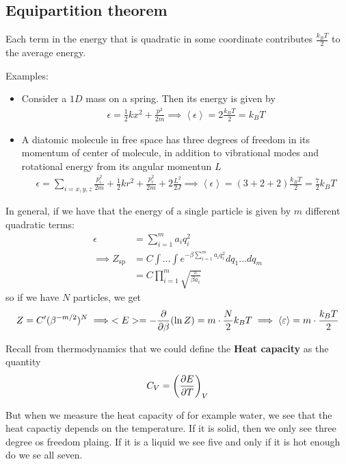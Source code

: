 \subsection{Equipartition theorem}
\begin{ntheorem}
	Each term in the energy that is quadratic in some coordinate contributes $\frac{k_B T}{2}$ to the average energy.
\end{ntheorem}
Examples:
\begin{itemize}
\item Consider a $1D$ mass on a spring. Then its energy is given by
	\begin{align*}
		\epsilon = \frac{1}{2} k x^2 + \frac{p^2}{2m} \implies \left<\epsilon\right> = 2 \frac{k_BT}{2} = k_B T
	\end{align*}
\item A diatomic molecule in free space has three degrees of freedom in its momentum of center of molecule, in addition to vibrational modes and rotational energy from its angular momentun $L$
	\begin{align*}
		\epsilon = \sum_{i = x,y,z} \frac{p_i^2}{2m} + \frac{1}{2} kr^2 + \frac{p_r^2}{2m} + 2 \frac{L^2}{2J} \implies \left<\epsilon\right> = (3 + 2 + 2) \frac{k_B T}{2} = \frac{7}{2}k_BT
	\end{align*}
\end{itemize}

In general, if we have that the energy of a single particle is given by $m$ different quadratic terms:
\begin{align*}
	\epsilon &= \sum_{i = 1}^{m}a_i q_i^2\\
	\implies Z_{\text{sp}} &= C \int \dots \int e^{-\beta \sum_{i = 1}^m a_i q_i^2} dq_1 \dots dq_m\\
												 &= C \prod_{i=1}^m	 \sqrt{\frac{\pi}{\beta a_i}}
\end{align*}
so if we have $N$ particles, we get
\begin{align*}
	Z = C' (\beta^{-m/2})^N \implies <E> = - \frac{\partial }{\partial \beta}(\ln Z) = m \cdot \frac{N}{2}k_{B}T \implies \left<\varepsilon\right> = m \cdot \frac{k_BT}{2}
\end{align*}

Recall from thermodynamics that we could define the \textbf{Heat capacity} as the quantity
\begin{align*}
	C_V = \left(\frac{\partial E}{\partial T}\right)_V
\end{align*}

But when we measure the heat capacity of for example water, we see that the heat capactiy depends on the temperature. If it is solid, then we only see three degree os freedom plaing. If it is a liquid we see five and only if it is hot enough do we se all seven.\\

